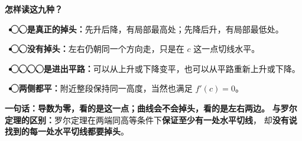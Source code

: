 \begin{explanationbox}
\textbf{怎样读这九种？}
\begin{itemize}
 \item \textbf{\textcircled{}、\textcircled{}是真正的掉头：}先升后降，有局部最高处；先降后升，有局部最低处。
 \item \textbf{\textcircled{}、\textcircled{}没有掉头：}左右仍朝同一个方向走，只是在 $c$ 这一点切线水平。
 \item \textbf{\textcircled{}、\textcircled{}、\textcircled{}、\textcircled{}是进出平路：}可以从上升或下降变平，也可以从平路重新上升或下降。
 \item \textbf{\textcircled{}两侧都平：}附近整段保持同一高度，当然也满足 $f'(c)=0$。
\end{itemize}

\textbf{一句话：导数为零，看的是这一点；曲线会不会掉头，看的是左右两边。}
\textbf{与罗尔定理的区别：}罗尔定理在两端同高等条件下\textbf{保证至少有一处水平切线}，
却\textbf{没有说找到的每一处水平切线都要掉头}。
\end{explanationbox}
